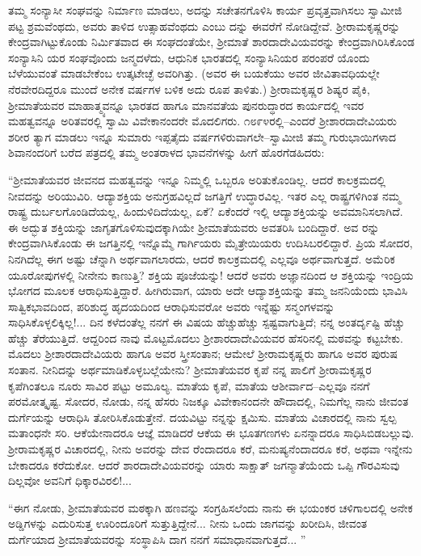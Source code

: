 ತಮ್ಮ ಸಂನ್ಯಾಸೀ ಸಂಘವನ್ನು ನಿರ್ಮಾಣ ಮಾಡಲು, ಅದನ್ನು ಸಚೇತನಗೊಳಿಸಿ ಕಾರ್ಯ ಪ್ರವೃತ್ತವಾಗಿಸಲು ಸ್ವಾಮೀಜಿ ಪಟ್ಟ ಶ್ರಮವೆಂಥದು, ಅವರು ತಾಳಿದ ಉತ್ಸಾಹವೆಂಥದು ಎಂಬು ದನ್ನು ಈವರೆಗೆ ನೋಡಿದ್ದೇವೆ. ಶ್ರೀರಾಮಕೃಷ್ಣರನ್ನು ಕೇಂದ್ರವಾಗಿಟ್ಟುಕೊಂಡು ನಿರ್ಮಿತವಾದ ಈ ಸಂಘದಂತೆಯೇ, ಶ್ರೀಮಾತೆ ಶಾರದಾದೇವಿಯವರನ್ನು ಕೇಂದ್ರವಾಗಿರಿಸಿಕೊಂಡ ಸಂನ್ಯಾಸಿನಿ ಯರ ಸಂಘವೊಂದು ಜನ್ಮದಳೆದು, ಆಧುನಿಕ ಭಾರತದಲ್ಲಿ ಸಂನ್ಯಾಸಿನಿಯರ ಪರಂಪರೆ ಯೊಂದು ಬೆಳೆಯುವಂತೆ ಮಾಡಬೇಕೆಂಬ ಉತ್ಕಟೇಚ್ಛೆ ಅವರಿಗಿತ್ತು. (ಅವರ ಈ ಬಯಕೆಯು ಅವರ ಜೀವಿತಾವಧಿಯಲ್ಲೇ ನೆರವೇರದಿದ್ದರೂ ಮುಂದೆ ಅನೇಕ ವರ್ಷಗಳ ಬಳಿಕ ಅದು ರೂಪ ತಾಳಿತು.) ಶ್ರೀರಾಮಕೃಷ್ಣರ ಶಿಷ್ಯರ ಪೈಕಿ, ಶ್ರೀಮಾತೆಯವರ ಮಾಹಾತ್ಮ್ಯವನ್ನೂ ಭಾರತದ ಹಾಗೂ ಮಾನವತೆಯ ಪುನರುದ್ಧಾರದ ಕಾರ್ಯದಲ್ಲಿ ಇವರ ಮಹತ್ವವನ್ನೂ ಅರಿತವರಲ್ಲಿ ಸ್ವಾಮಿ ವಿವೇಕಾನಂದರೇ ಮೊದಲಿಗರು. ೧೮೯೪ರಲ್ಲಿ–ಎಂದರೆ ಶ್ರೀಶಾರದಾದೇವಿಯರು ಶರೀರ ತ್ಯಾಗ ಮಾಡಲು ಇನ್ನೂ ಸುಮಾರು ಇಪ್ಪತೈದು ವರ್ಷಗಳಿರುವಾಗಲೇ–ಸ್ವಾಮೀಜಿ ತಮ್ಮ ಗುರುಭಾಯಿಗಳಾದ ಶಿವಾನಂದರಿಗೆ ಬರೆದ ಪತ್ರದಲ್ಲಿ ತಮ್ಮ ಅಂತರಾಳದ ಭಾವನೆಗಳನ್ನು ಹೀಗೆ ಹೊರಗೆಡಹಿದರು:

“ಶ್ರೀಮಾತೆಯವರ ಜೀವನದ ಮಹತ್ವವನ್ನು ಇನ್ನೂ ನಿಮ್ಮಲ್ಲಿ ಒಬ್ಬರೂ ಅರಿತುಕೊಂಡಿಲ್ಲ. ಆದರೆ ಕಾಲಕ್ರಮದಲ್ಲಿ ನೀವದನ್ನು ಅರಿಯುವಿರಿ. ಆದ್ಯಾಶಕ್ತಿಯ ಅನುಗ್ರಹವಿಲ್ಲದೆ ಜಗತ್ತಿಗೆ ಉದ್ಧಾರವಿಲ್ಲ. ಇತರ ಎಲ್ಲ ರಾಷ್ಟ್ರಗಳಿಗಿಂತ ನಮ್ಮ ರಾಷ್ಟ್ರ ದುರ್ಬಲಗೊಂಡಿದೆಯಲ್ಲ, ಹಿಂದುಳಿದಿದೆಯಲ್ಲ, ಏಕೆ? ಏಕೆಂದರೆ ಇಲ್ಲಿ ಆದ್ಯಾಶಕ್ತಿಯನ್ನು ಅವಮಾನಿಸಲಾಗಿದೆ. ಈ ಅದ್ಭುತ ಶಕ್ತಿಯನ್ನು ಜಾಗೃತಗೊಳಿಸುವುದಕ್ಕಾಗಿಯೇ ಶ್ರೀಮಾತೆಯವರು ಅವತರಿಸಿ ಬಂದಿದ್ದಾರೆ. ಅವ ರನ್ನು ಕೇಂದ್ರವಾಗಿಸಿಕೊಂಡು ಈ ಜಗತ್ತಿನಲ್ಲಿ ಇನ್ನೊಮ್ಮೆ ಗಾರ್ಗಿಯರು ಮೈತ್ರೇಯಿಯರು ಉದಿಸಿಬರಲಿದ್ದಾರೆ. ಪ್ರಿಯ ಸೋದರ, ನಿನಗಿದೆಲ್ಲ ಈಗ ಅಷ್ಟು ಚೆನ್ನಾಗಿ ಅರ್ಥವಾಗಲಾರದು, ಆದರೆ ಕಾಲಕ್ರಮದಲ್ಲಿ ಎಲ್ಲವೂ ಅರ್ಥವಾಗುತ್ತದೆ. ಅಮೆರಿಕ ಯೂರೋಪುಗಳಲ್ಲಿ ನೀನೇನು ಕಾಣುತ್ತಿ? ಶಕ್ತಿಯ ಪೂಜೆಯನ್ನು! ಆದರೆ ಅವರು ಅಜ್ಞಾನದಿಂದ ಆ ಶಕ್ತಿಯನ್ನು ಇಂದ್ರಿಯ ಭೋಗದ ಮೂಲಕ ಆರಾಧಿಸುತ್ತಿದ್ದಾರೆ. ಹೀಗಿರುವಾಗ, ಯಾರು ಅದೇ ಆದ್ಯಾಶಕ್ತಿಯನ್ನು ತಮ್ಮ ಜನನಿಯೆಂದು ಭಾವಿಸಿ ಸಾತ್ವಿಕಭಾವದಿಂದ, ಪರಿಶುದ್ಧ ಹೃದಯದಿಂದ ಆರಾಧಿಸುವರೋ ಅವರು ಇನ್ನೆಷ್ಟು ಸನ್ಮಂಗಳವನ್ನು ಸಾಧಿಸಿಕೊಳ್ಳಲಿಕ್ಕಿಲ್ಲ!... ದಿನ ಕಳೆದಂತೆಲ್ಲ ನನಗೆ ಈ ವಿಷಯ ಹೆಚ್ಚುಹೆಚ್ಚು ಸ್ಪಷ್ಟವಾಗುತ್ತಿದೆ; ನನ್ನ ಅಂತರ್ದೃಷ್ಟಿ ಹೆಚ್ಚು ಹೆಚ್ಚು ತೆರೆಯುತ್ತಿದೆ. ಆದ್ದರಿಂದ ನಾವು ಮೊಟ್ಟಮೊದಲು ಶ್ರೀಶಾರದಾದೇವಿಯವರ ಹೆಸರಿನಲ್ಲಿ ಮಠವನ್ನು ಕಟ್ಟಬೇಕು. ಮೊದಲು ಶ್ರೀಶಾರದಾದೇವಿಯರು ಹಾಗೂ ಅವರ ಸ್ತ್ರೀಸಂತಾನ; ಆಮೇಲೆ ಶ್ರೀರಾಮಕೃಷ್ಣರು ಹಾಗೂ ಅವರ ಪುರುಷ ಸಂತಾನ. ನೀನಿದನ್ನು ಅರ್ಥಮಾಡಿಕೊಳ್ಳಬಲ್ಲೆಯೇನು? ಶ್ರೀಮಾತೆಯವರ ಕೃಪೆ ನನ್ನ ಪಾಲಿಗೆ ಶ್ರೀರಾಮಕೃಷ್ಣರ ಕೃಪೆಗಿಂತಲೂ ನೂರು ಸಾವಿರ ಪಟ್ಟು ಅಮೂಲ್ಯ. ಮಾತೆಯ ಕೃಪೆ, ಮಾತೆಯ ಆಶೀರ್ವಾದ–ಎಲ್ಲವೂ ನನಗೆ ಪರಮೋತ್ಕೃಷ್ಟ. ಸೋದರ, ನೋಡು, ನನ್ನ ಹೆಸರು ನಿಜಕ್ಕೂ ವಿವೇಕಾನಂದನೇ ಹೌದಾದಲ್ಲಿ, ನಿಮಗೆಲ್ಲ ನಾನು ಜೀವಂತ ದುರ್ಗೆಯನ್ನು ಆರಾಧಿಸಿ ತೋರಿಸಿಕೊಡುತ್ತೇನೆ. ದಯವಿಟ್ಟು ನನ್ನನ್ನು ಕ್ಷಮಿಸು. ಮಾತೆಯ ವಿಚಾರದಲ್ಲಿ ನಾನು ಸ್ವಲ್ಪ ಮತಾಂಧನೇ ಸರಿ. ಆಕೆಯೇನಾದರೂ ಆಜ್ಞೆ ಮಾಡಿದರೆ ಆಕೆಯ ಈ ಭೂತಗಣಗಳು ಏನನ್ನಾದರೂ ಸಾಧಿಸಿಬಿಡಬಲ್ಲುವು. ಶ್ರೀರಾಮಕೃಷ್ಣರ ವಿಚಾರದಲ್ಲಿ, ನೀನು ಅವರನ್ನು ದೇವ ರೆಂದಾದರೂ ಕರೆ, ಮನುಷ್ಯನೆಂದಾದರೂ ಕರೆ, ಅಥವಾ ಇನ್ನೇನು ಬೇಕಾದರೂ ಕರೆದುಕೋ. ಆದರೆ ಶಾರದಾದೇವಿಯವರನ್ನು ಯಾರು ಸಾಕ್ಷಾತ್ ಜಗನ್ಮಾತೆಯೆಂದು ಒಪ್ಪಿ ಗೌರವಿಸುವು ದಿಲ್ಲವೋ ಅವನಿಗೆ ಧಿಕ್ಕಾರವಿರಲಿ!... 

“ಈಗ ನೋಡು, ಶ್ರೀಮಾತೆಯವರ ಮಠಕ್ಕಾಗಿ ಹಣವನ್ನು ಸಂಗ್ರಹಿಸಲೆಂದು ನಾನು ಈ ಭಯಂಕರ ಚಳಿಗಾಲದಲ್ಲಿ ಅನೇಕ ಅಡ್ಡಿಗಳನ್ನು ಎದುರಿಸುತ್ತ ಊರಿಂದೂರಿಗೆ ಸುತ್ತುತ್ತಿದ್ದೇನೆ... ನೀನು ಒಂದು ಜಾಗವನ್ನು ಖರೀದಿಸಿ, ಜೀವಂತ ದುರ್ಗೆಯಾದ ಶ್ರೀಮಾತೆಯವರನ್ನು ಸಂಸ್ಥಾಪಿಸಿ ದಾಗ ನನಗೆ ಸಮಾಧಾನವಾಗುತ್ತದೆ... ”

